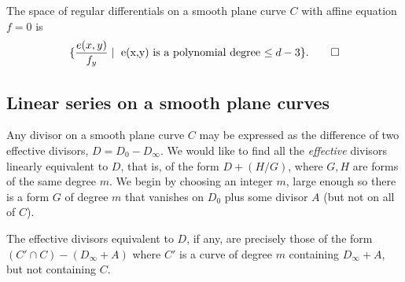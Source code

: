 \begin{theorem}
The space of regular differentials on a smooth plane curve $C$
with affine equation $f=0$ is 
$$
\{ \frac{e(x,y)}{f_{y}} \mid \hbox{ e(x,y) is a polynomial degree $\leq d-3$}\}.\qed
 $$
\end{theorem}
%
%

\subsection{Linear series on a smooth plane curves}\label{linear series on smooth plane curves}

Any divisor on a smooth plane curve $C$ may be expressed as the difference of
two effective divisors, $D= D_0-D_\infty$. We would like to find all the \emph{effective} divisors linearly equivalent to $D$, that is, of the form
$D + (H/G)$, where $G, H$ are forms of the same degree $m$. We begin by choosing
an integer $m$, large enough so there is a form $G$ of degree $m$ that vanishes on $D_0$ plus some divisor $A$ (but not on all of $C$). 

\begin{theorem}\label{equiv on smooth plane curve}
The effective divisors equivalent to $D$, if any, are precisely those of the form $(C'\cap C) -(D_\infty+A)$ where $C'$
is a curve of degree $m$ containing $D_\infty+A$, but not containing $C$.
\end{theorem}

